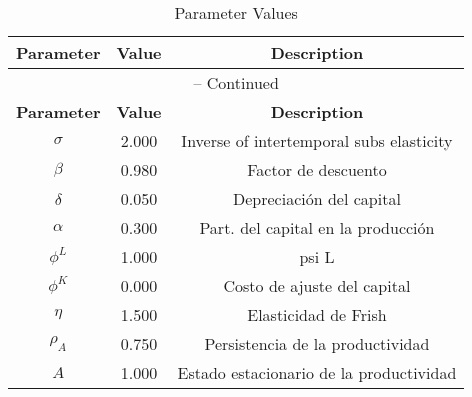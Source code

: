 \begin{center}
\begin{longtable}{ccc}
\caption{Parameter Values}\\%
\toprule%
\multicolumn{1}{c}{\textbf{Parameter}} &
\multicolumn{1}{c}{\textbf{Value}} &
 \multicolumn{1}{c}{\textbf{Description}}\\%
\midrule%
\endfirsthead
\multicolumn{3}{c}{{\tablename} \thetable{} -- Continued}\\%
\midrule%
\multicolumn{1}{c}{\textbf{Parameter}} &
\multicolumn{1}{c}{\textbf{Value}} &
  \multicolumn{1}{c}{\textbf{Description}}\\%
\midrule%
\endhead
$\sigma$ 	 & 	 2.000 	 & 	 Inverse of intertemporal subs elasticity\\
$\beta$ 	 & 	 0.980 	 & 	 Factor de descuento\\
$\delta$ 	 & 	 0.050 	 & 	 Depreciación del capital\\
$\alpha$ 	 & 	 0.300 	 & 	 Part. del capital en la producción\\
$\phi^{L}$ 	 & 	 1.000 	 & 	 psi L\\
$\phi^{K}$ 	 & 	 0.000 	 & 	 Costo de ajuste del capital\\
$\eta$ 	 & 	 1.500 	 & 	 Elasticidad de Frish\\
$\rho_{A}$ 	 & 	 0.750 	 & 	 Persistencia de la productividad\\
$A$ 	 & 	 1.000 	 & 	 Estado estacionario de la productividad\\
\bottomrule%
\end{longtable}
\end{center}
